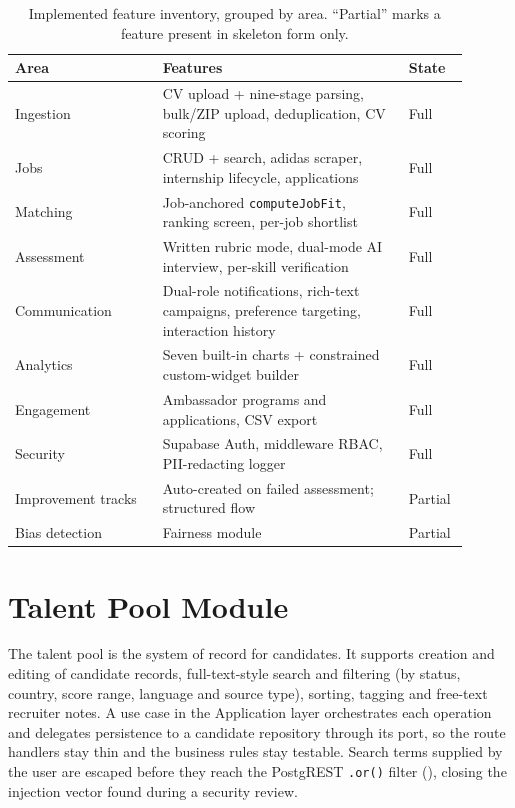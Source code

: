 \begin{table}[ht]
\centering
\caption[Implemented feature inventory]{Implemented feature inventory, grouped
by area. ``Partial'' marks a feature present in skeleton form only.}
\label{tab:feature-inventory}
\small
\begin{tabular}{p{0.30\linewidth}p{0.50\linewidth}p{0.10\linewidth}}
\toprule
\textbf{Area} & \textbf{Features} & \textbf{State} \\
\midrule
Ingestion & CV upload + nine-stage parsing, bulk/ZIP upload, deduplication, CV scoring & Full \\
Jobs & CRUD + search, adidas scraper, internship lifecycle, applications & Full \\
Matching & Job-anchored \texttt{computeJobFit}, ranking screen, per-job shortlist & Full \\
Assessment & Written rubric mode, dual-mode AI interview, per-skill verification & Full \\
Communication & Dual-role notifications, rich-text campaigns, preference targeting, interaction history & Full \\
Analytics & Seven built-in charts + constrained custom-widget builder & Full \\
Engagement & Ambassador programs and applications, CSV export & Full \\
Security & Supabase Auth, middleware RBAC, PII-redacting logger & Full \\
Improvement tracks & Auto-created on failed assessment; structured flow & Partial \\
Bias detection & Fairness module & Partial \\
\bottomrule
\end{tabular}
\end{table}


\section{Talent Pool Module}
\label{sec:impl-pool}

The talent pool is the system of record for candidates. It supports creation
and editing of candidate records, full-text-style search and filtering (by
status, country, score range, language and source type), sorting, tagging and
free-text recruiter notes. A use case in the Application layer orchestrates
each operation and delegates persistence to a candidate repository through
its port, so the route handlers stay thin and the business rules stay
testable. Search terms supplied by the user are escaped before they reach the
PostgREST \texttt{.or()} filter (), closing the
injection vector found during a security review.

